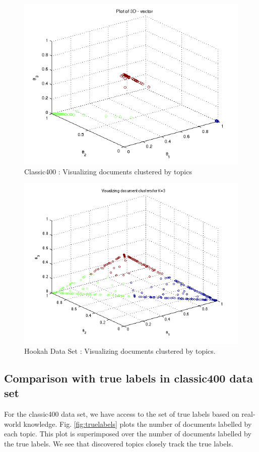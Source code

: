 \documentclass[11pt,a4paper,oneside]{article}
\begin{document}
\begin{figure}[H]
\centering
\includegraphics[width=\columnwidth]{scatter_classic400}
\caption{Classic400 : Visualizing documents clustered by topics}
\label{fig:scatter_classic400}
\end{figure}

\begin{figure}[H]
\centering
\includegraphics[width=\columnwidth]{scatter_hookah}
\caption{Hookah Data Set : Visualizing documents clustered by topics.}
\label{fig:scatter_hookah}
\end{figure}

\subsection{Comparison with true labels in classic400 data set}
For the classic400 data set, we have access to the set of true labels based on real-world knowledge. Fig. \ref{fig:truelabels} plots the number of documents labelled by each topic. This plot is superimposed over the number of documents labelled by the true labels. We see that discovered topics closely track the true labels.
\end{document}
